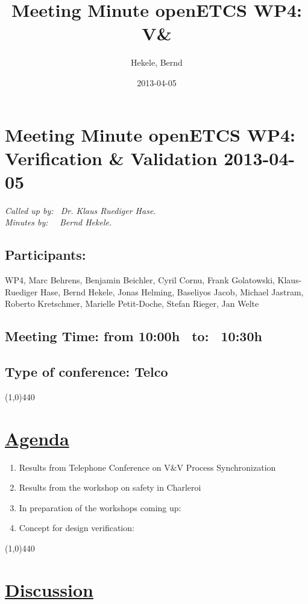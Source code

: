 \documentclass[a4paper]{article}
\title{Meeting Minute openETCS WP4: V&\V}
\author{Hekele, Bernd}
\date{2013-04-05}
\begin{document}
\section*{\large{Meeting Minute openETCS WP4: Verification \& Validation 2013-04-05}}

\emph{Called up by: \ Dr. Klaus Ruediger Hase.}\\
\emph{Minutes by: \ \  Bernd Hekele.}


\subsection*{Participants:} WP4, 
Marc Behrens, 
Benjamin Beichler,
Cyril Cornu, 
Frank Golatowski, 
Klaus-Ruediger Hase, 
Bernd Hekele,
Jonas Helming,
Baseliyos Jacob,
Michael Jastram, 
Roberto Kretschmer,
Marielle Petit-Doche, 
Stefan Rieger,
Jan Welte\\


\subsection*{Meeting Time: from 10:00h \ to: \ 10:30h}

\subsection*{Type of conference: Telco}

\line(1,0){440}
\section*{\underline{Agenda}}
\begin{enumerate}
\item Results from Telephone Conference on V\&V Process Synchronization 
\item Results from the workshop on safety in Charleroi
\item In preparation of the workshops coming up:
\item Concept for design verification: 
\end{enumerate}
\line(1,0){440}
\section*{\underline{Discussion}}
\end{document}
